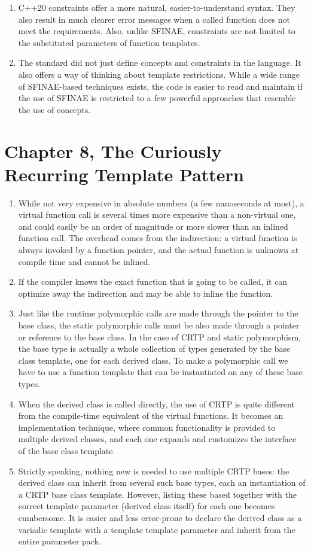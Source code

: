 \begin{enumerate}
\item
  C++20 constraints offer a more natural, easier-to-understand syntax. They also result in much clearer error messages when a called function does not meet the requirements. Also, unlike SFINAE, constraints are not limited to the substituted parameters of function templates.
\item
  The standard did not just define concepts and constraints in the language. It also offers a way of thinking about template restrictions. While a wide range of SFINAE-based techniques exists, the code is easier to read and maintain if the use of SFINAE is restricted to a few powerful approaches that resemble the use of concepts.
\end{enumerate}

\section{Chapter 8, The Curiously Recurring Template Pattern}

\begin{enumerate}
\item
  While not very expensive in absolute numbers (a few nanoseconds at most), a virtual function call is several times more expensive than a non-virtual one, and could easily be an order of magnitude or more slower than an inlined function call. The overhead comes from the indirection: a virtual function is always invoked by a function pointer, and the actual function is unknown at compile time and cannot be inlined.
\item
  If the compiler knows the exact function that is going to be called, it can optimize away the indirection and may be able to inline the function.
\item
  Just like the runtime polymorphic calls are made through the pointer to the base class, the static polymorphic calls must be also made through a pointer or reference to the base class. In the case of CRTP and static polymorphism, the base type is actually a whole collection of types generated by the base class template, one for each derived class. To make a polymorphic call we have to use a function template that can be instantiated on any of these base types.
\item
  When the derived class is called directly, the use of CRTP is quite different from the compile-time equivalent of the virtual functions. It becomes an implementation technique, where common functionality is provided to multiple derived classes, and each one expands and customizes the interface of the base class template.
\item
  Strictly speaking, nothing new is needed to use multiple CRTP bases: the derived class can inherit from several such base types, each an instantiation of a CRTP base class template. However, listing these based together with the correct template parameter (derived class itself) for each one becomes cumbersome. It is easier and less error-prone to declare the derived class as a variadic template with a template template parameter and inherit from the entire parameter pack.
\end{enumerate}

